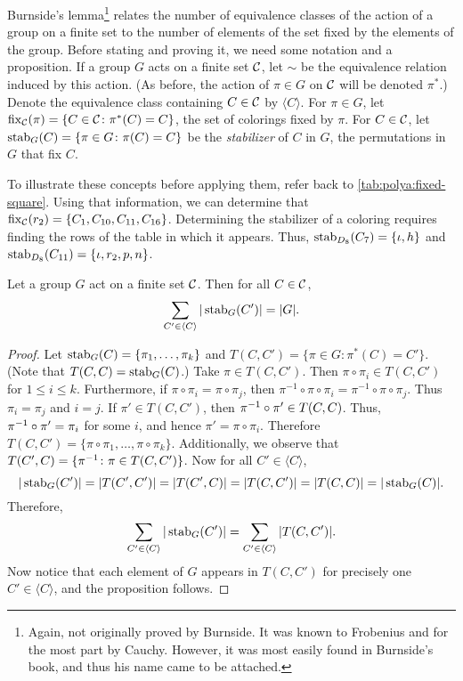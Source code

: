 Burnside's lemma\footnote{Again, not originally proved by Burnside. It
  was known to Frobenius and for the most part by Cauchy. However, it
  was most easily found in Burnside's book, and thus his name came to
  be attached.} relates the number of equivalence classes of the
action of a group on a finite set to the number of elements of the set
fixed by the elements of the group. Before stating and proving it, we
need some notation and a proposition. If a group $G$ acts on a finite
set $\mathcal{C}$, let $\sim$ be the equivalence relation induced by this
action. (As before, the action of $\pi\in G$ on $\mathcal{C}$ will be denoted
$\pi^*$.) Denote the equivalence class containing $C\in \mathcal{C}$ by
$\langle C\rangle$. For $\pi\in G$, let $\operatorname{fix}_{\mathcal{C}}(\pi)=\{C\in
\mathcal{C}\colon \pi^*(C) = C\}$, the set of colorings fixed by $\pi$. For
$C\in\mathcal{C}$, let $\operatorname{stab}_G(C)=\{\pi\in G\colon \pi(C) = C\}$ be the
\emph{stabilizer} of $C$ in $G$, the permutations in $G$ that fix $C$.

To illustrate these concepts before applying them, refer back to
\autoref{tab:polya:fixed-square}. Using that information, we can
determine that $\operatorname{fix}_{\mathcal{C}}(r_2) =
\{C_1,C_{10},C_{11},C_{16}\}$. Determining the stabilizer of a
coloring requires finding the rows of the table in which it
appears. Thus, $\operatorname{stab}_{D_8}(C_7) = \{\iota,h\}$ and
$\operatorname{stab}_{D_8}(C_{11}) = \{\iota,r_2,p,n\}$.

\begin{proposition}\label{prop:polya:sum-stabs}
  Let a group $G$ act on a finite set $\mathcal{C}$. Then for all $C\in \mathcal{C}$,
  \[\sum_{C'\in\langle C\rangle} |\operatorname{stab}_G(C')| = |G|.\]
\end{proposition}

\begin{proof}
  Let $\operatorname{stab}_G(C) = \{\pi_1,\dots,\pi_k\}$ and $T(C,C') = \{\pi\in
  G\colon \pi^*(C) = C'\}$. (Note that $T(C,C) = \operatorname{stab}_G(C)$.) Take
  $\pi\in T(C,C')$. Then $\pi\circ \pi_i\in T(C,C')$ for $1\leq i\leq
  k$. Furthermore, if $\pi\circ \pi_i = \pi\circ \pi_j$, then
  $\pi^{-1}\circ\pi\circ \pi_i=\pi^{-1}\circ\pi\circ \pi_j$. Thus
  $\pi_i=\pi_j$ and $i=j$. If $\pi'\in T(C,C')$, then $\pi^{-1}\circ
  \pi'\in T(C,C)$. Thus, $\pi^{-1}\circ\pi' = \pi_i$ for some $i$, and
  hence $\pi' = \pi\circ \pi_i$. Therefore $T(C,C') =
  \{\pi\circ\pi_1,\dots,\pi\circ\pi_k\}$. Additionally, we observe
  that $T(C',C) = \{\pi^{-1}\colon \pi\in T(C,C')\}$. Now for all
  $C'\in\langle C\rangle$, \[|\operatorname{stab}_G(C')|=|T(C',C')|=|T(C',C)| =
  |T(C,C')| = |T(C,C)| = |\operatorname{stab}_G(C)|.\]
  Therefore, \[\sum_{C'\in\langle C\rangle}|\operatorname{stab}_G(C')| =
  \sum_{C'\in\langle C\rangle} |T(C,C')|.\] Now notice that each
  element of $G$ appears in $T(C,C')$ for precisely one $C'\in\langle
  C\rangle$, and the proposition follows.
\end{proof}

